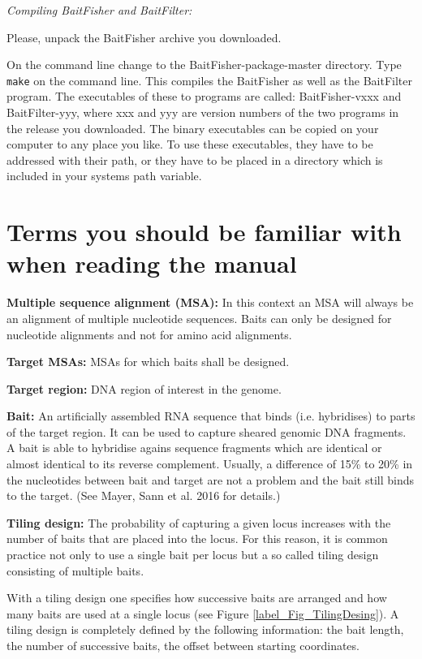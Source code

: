 \documentclass[a4paper,pdflatex,11pt]{article}
\begin{document}
\emph{Compiling BaitFisher and BaitFilter:}

Please, unpack the BaitFisher archive you downloaded.

On the command line change to the BaitFisher-package-master directory. 
Type \verb+make+ on the command line. This compiles the BaitFisher as well as
the BaitFilter program. The executables of these to programs are
called: BaitFisher-vxxx and BaitFilter-yyy, where xxx and yyy are version numbers
of the two programs in the release you downloaded.
The binary executables can be copied on
your computer to any place you like. To use these executables, they have
to be addressed with their path, or they have to be placed in a directory which is included
in your systems path variable.

\section{Terms you should be familiar with when reading the manual }

\textbf{Multiple sequence alignment (MSA):}
In this context an MSA will always be an alignment of multiple
nucleotide sequences. Baits can only be designed for nucleotide
alignments and not for amino acid alignments.

\textbf{Target MSAs:}
MSAs for which baits shall be designed.


\textbf{Target region:}
DNA region of interest in the genome.

\textbf{Bait:}
An artificially assembled RNA sequence that binds (i.e. hybridises) to parts of the target
region. It can be used to capture sheared genomic DNA fragments.
A bait is able to hybridise agains sequence fragments which
are identical or almost identical to its reverse complement.
Usually, a difference of 15\% to 20\% in the nucleotides between bait and target are not
a problem and the bait still binds to the target. (See Mayer, Sann et al. 2016 for details.)

\textbf{Tiling design:}
The probability of capturing a given locus increases with the number of baits that are
placed into the locus. 
For this reason, it is common practice not only to use a single bait per locus but a
so called tiling design consisting of multiple baits.

With a tiling design one specifies how successive baits are arranged and how many baits are used at a single locus
(see Figure \ref{label_Fig_TilingDesing}).
A tiling design is completely defined by the following information: the bait length,
the number of successive baits, the offset between starting coordinates.
\end{document}
